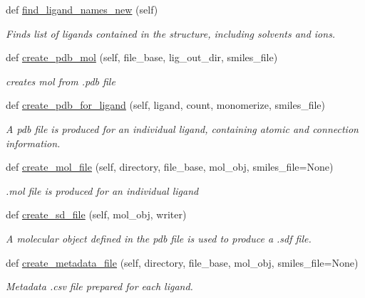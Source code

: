 \begin{DoxyCompactItemize}
def \hyperlink{classfragalysis__api_1_1xcimporter_1_1conversion__pdb__mol_1_1_ligand_aa9601289368daa83655aa849041e7b63}{find\+\_\+ligand\+\_\+names\+\_\+new} (self)
\begin{DoxyCompactList}\small\item\em Finds list of ligands contained in the structure, including solvents and ions. \end{DoxyCompactList}\item 
def \hyperlink{classfragalysis__api_1_1xcimporter_1_1conversion__pdb__mol_1_1_ligand_a4603fdd993d7b6b4cebea13a5ada16c2}{create\+\_\+pdb\+\_\+mol} (self, file\+\_\+base, lig\+\_\+out\+\_\+dir, smiles\+\_\+file)
\begin{DoxyCompactList}\small\item\em creates mol from .pdb file \end{DoxyCompactList}\item 
def \hyperlink{classfragalysis__api_1_1xcimporter_1_1conversion__pdb__mol_1_1_ligand_ada1d85b43009efb4da6cf5b17c851783}{create\+\_\+pdb\+\_\+for\+\_\+ligand} (self, ligand, count, monomerize, smiles\+\_\+file)
\begin{DoxyCompactList}\small\item\em A pdb file is produced for an individual ligand, containing atomic and connection information. \end{DoxyCompactList}\item 
def \hyperlink{classfragalysis__api_1_1xcimporter_1_1conversion__pdb__mol_1_1_ligand_a811498c568a5f12e8047ced3640a3c90}{create\+\_\+mol\+\_\+file} (self, directory, file\+\_\+base, mol\+\_\+obj, smiles\+\_\+file=None)
\begin{DoxyCompactList}\small\item\em .mol file is produced for an individual ligand \end{DoxyCompactList}\item 
def \hyperlink{classfragalysis__api_1_1xcimporter_1_1conversion__pdb__mol_1_1_ligand_a9985de5dae739f11768aa6985ccd94bd}{create\+\_\+sd\+\_\+file} (self, mol\+\_\+obj, writer)
\begin{DoxyCompactList}\small\item\em A molecular object defined in the pdb file is used to produce a .sdf file. \end{DoxyCompactList}\item 
def \hyperlink{classfragalysis__api_1_1xcimporter_1_1conversion__pdb__mol_1_1_ligand_a58df3b55a6aca35511598a8d0e25ed6d}{create\+\_\+metadata\+\_\+file} (self, directory, file\+\_\+base, mol\+\_\+obj, smiles\+\_\+file=None)
\begin{DoxyCompactList}\small\item\em Metadata .csv file prepared for each ligand. \end{DoxyCompactList}\end{DoxyCompactItemize}
